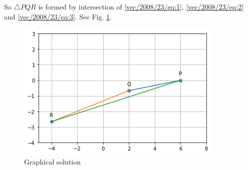 So $\triangle PQR$ is formed by intersection of \eqref{vec/2008/23/eq:1},
\eqref{vec/2008/23/eq:2} and \eqref{vec/2008/23/eq:3}.  See Fig.     \ref{vec/2008/23/Graphical solution}.
%
\begin{figure}[ht]
    \centering
    \includegraphics[width=\columnwidth]{vectors/solutions/2008/23/download.png}
    \caption{Graphical solution}
    \label{vec/2008/23/Graphical solution}
\end{figure}


